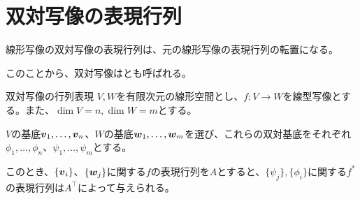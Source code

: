 \documentclass[../../../topic_linear-algebra]{subfiles}
\begin{document}
\sectionline
\section{双対写像の表現行列}

\begin{mindflow}
\end{mindflow}

線形写像の双対写像の表現行列は、元の線形写像の表現行列の転置になる。

このことから、双対写像はとも呼ばれる。

\begin{theorem}{双対写像の行列表現}
  $V,W$を有限次元の線形空間とし、$f\colon V \to W$を線型写像とする。また、$\dim V = n, \dim W = m$とする。
  
  $V$の基底$\vb*{v}_1,\ldots,\vb*{v}_n$、$W$の基底$\vb*{w}_1, \ldots, \vb*{w}_m$を選び、これらの双対基底をそれぞれ$\phi_1, \ldots, \phi_n$、$\psi_1, \ldots, \psi_m$とする。

  このとき、$\{\vb*{v}_i \}$、$\{ \vb*{w}_j\}$に関する$f$の表現行列を$A$とすると、$\{ \psi_j \}, \{ \phi_i \}$に関する$f^*$の表現行列は$A^\top$によって与えられる。
\end{theorem}
\end{document}
